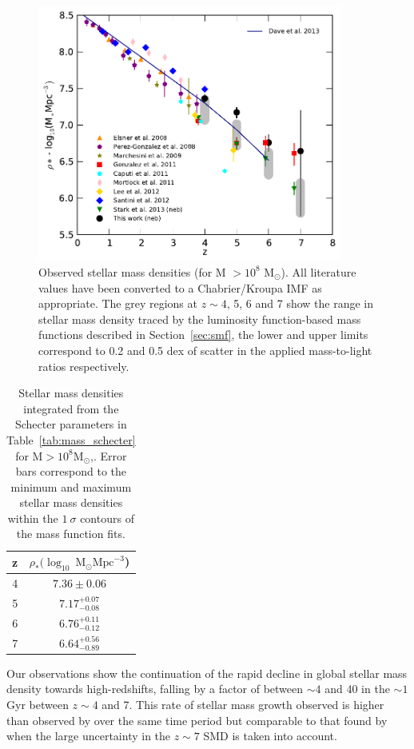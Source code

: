 \begin{figure}
\centering
\includegraphics[width=100mm]{plots/fig12.pdf}
\caption[Short caption]{Observed stellar mass densities (for M $>10^8$ M$_{\odot}$). All literature values have been converted to a Chabrier/Kroupa IMF as appropriate. The grey regions at $z \sim 4$, 5, 6 and 7 show the range in stellar mass density traced by the luminosity function-based mass functions described in Section~\ref{sec:smf}, the lower and upper limits correspond to 0.2 and 0.5 dex of scatter in the applied mass-to-light ratios respectively.}
\label{fig:smd_evolution}
\end{figure}


\begin{table}
\centering
\label{tab:smd}
\caption[Short caption]{Stellar mass densities integrated from the Schecter parameters in Table~\ref{tab:mass_schecter} for $\text{M} > 10^8 \text{M}_{\odot}$,. Error bars correspond to the minimum and maximum stellar mass densities within the $1~\sigma$ contours of the mass function fits.}
\begin{tabular}{c c}
\hline
z & $\rho_{*} (\log_{10}~\text{M}_{\odot} \text{Mpc}^{-3}$)\\
\hline
4 & $7.36\pm0.06$ \\
5 & $7.17^{+0.07}_{-0.08}$ \\
6 & $6.76^{+0.11}_{-0.12}$ \\
7 & $6.64^{+0.56}_{-0.89}$ \\
\hline
\end{tabular}
\end{table}

Our observations show the continuation of the rapid decline in global stellar mass density towards high-redshifts, falling by a factor of between $\sim 4$ and 40 in the $\sim 1$ Gyr between $z \sim 4$ and 7. This rate of stellar mass growth observed is higher than observed by \citet{Gonzalez:2011dn} over the same time period but comparable to that found by \citet{Stark:2013ix} when the large uncertainty in the $z\sim7$ SMD is taken into account.

